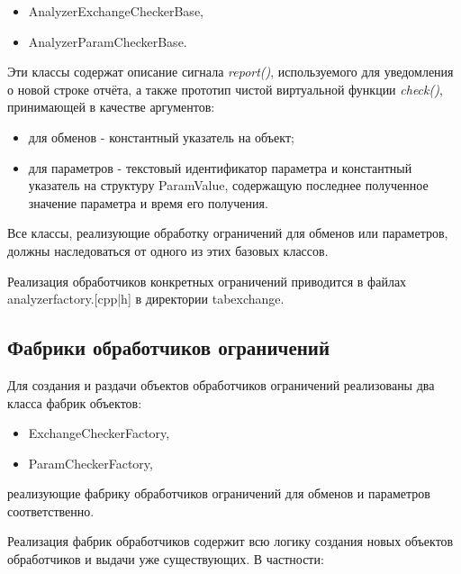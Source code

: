 \begin{itemize}
 \item AnalyzerExchangeCheckerBase,
 \item AnalyzerParamCheckerBase.
\end{itemize}

Эти классы содержат описание сигнала \textit{report()}, используемого для 
уведомления о новой строке отчёта, а также прототип чистой виртуальной функции 
\textit{check()}, принимающей в качестве аргументов:

\begin{itemize}
 \item для обменов - константный указатель на объект;
 \item для параметров - текстовый идентификатор параметра и константный 
указатель на структуру ParamValue, содержащую последнее полученное значение 
параметра и время его получения.
\end{itemize}

Все классы, реализующие обработку ограничений для обменов или параметров, 
должны наследоваться от одного из этих базовых классов.

Реализация обработчиков конкретных ограничений приводится в файлах 
analyzerfactory.[cpp|h] в директории tabexchange.

\subsection{Фабрики обработчиков ограничений}

Для создания и раздачи объектов обработчиков ограничений реализованы два класса 
фабрик объектов:

\begin{itemize}
 \item ExchangeCheckerFactory,
 \item ParamCheckerFactory,
\end{itemize}

реализующие фабрику обработчиков ограничений для обменов и параметров 
соответственно.

Реализация фабрик обработчиков содержит всю логику создания новых объектов 
обработчиков и выдачи уже существующих. В частности:

